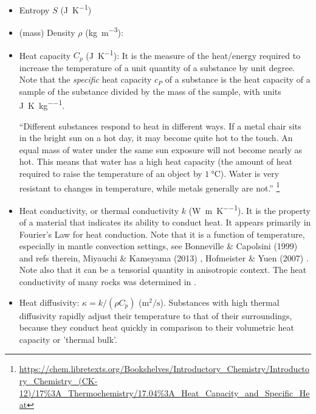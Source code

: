 \begin{itemize}
\item {\color{violet} Entropy} $S$ (\si{\joule\per\kelvin})

\item {\color{violet} (mass) Density} $\rho$ (\si{\kg\per\cubic\metre}):

\item {\color{violet} Heat capacity} $C_p$ (\si{\joule\per\kelvin}): 
It is the measure of the heat/energy required to increase the 
temperature of a unit quantity of a substance by unit degree. Note that the {\it specific} 
heat capacity $c_P$ of a substance is the heat capacity of a sample of the substance 
divided by the mass of the sample, with units \si{\joule\per\kelvin\per\kg}.

``Different substances respond to heat in different ways. If a metal chair sits in the bright sun 
on a hot day, it may become quite hot to the touch. An equal mass of water under the same sun exposure will 
not become nearly as hot. This means that water has a high heat capacity (the amount of heat required to 
raise the temperature of an object by $1~\si{\celsius}$). Water is very resistant to changes in temperature, 
while metals generally are not.''
\footnote{\url{https://chem.libretexts.org/Bookshelves/Introductory_Chemistry/Introductory_Chemistry_(CK-12)/17\%3A_Thermochemistry/17.04\%3A_Heat_Capacity_and_Specific_Heat}}


\item {\color{violet} Heat conductivity}, or thermal conductivity $k$ (\si{\watt\per\metre\per\kelvin}). 
It is the property of a material that indicates its ability to conduct heat. It appears primarily 
in Fourier's Law for heat conduction.
Note that it is a function of temperature, especially in mantle convection settings,
see Bonneville \& Capolsini (1999) \cite{boca99} and refs therein, 
Miyauchi \& Kameyama (2013) \cite{mika13}, Hofmeister \& Yuen (2007) \cite{hoyu07}. 
Note also that it can be a tensorial quantity in anisotropic context.
The heat conductivity of many rocks was determined in \cite{ando13}.

\item {\color{violet} Heat diffusivity}: $\kappa=k/(\rho C_p)$ ($\si{\square\meter\per\second}$). 
Substances with high thermal diffusivity rapidly adjust their temperature to that of their surroundings, because they 
conduct heat quickly in comparison to their volumetric heat capacity or 'thermal bulk'.


\end{itemize}
